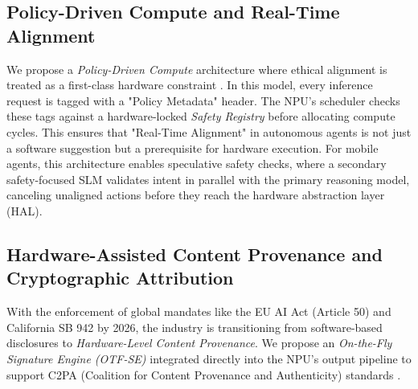 \documentclass[twocolumn,10pt]{article}
\begin{document}
\subsection{Policy-Driven Compute and Real-Time Alignment}
We propose a \textit{Policy-Driven Compute} architecture where ethical alignment is treated as a first-class hardware constraint \cite{policydriven2026}. In this model, every inference request is tagged with a "Policy Metadata" header. The NPU's scheduler checks these tags against a hardware-locked \textit{Safety Registry} before allocating compute cycles. This ensures that "Real-Time Alignment" in autonomous agents is not just a software suggestion but a prerequisite for hardware execution. For mobile agents, this architecture enables speculative safety checks, where a secondary safety-focused SLM validates intent in parallel with the primary reasoning model, canceling unaligned actions before they reach the hardware abstraction layer (HAL).

\subsection{Hardware-Assisted Content Provenance and Cryptographic Attribution}
With the enforcement of global mandates like the EU AI Act (Article 50) \cite{eu_ai_act_2024} and California SB 942 \cite{ca_sb942_2024} by 2026, the industry is transitioning from software-based disclosures to \textit{Hardware-Level Content Provenance}. We propose an \textit{On-the-Fly Signature Engine (OTF-SE)} integrated directly into the NPU's output pipeline to support C2PA (Coalition for Content Provenance and Authenticity) standards \cite{c2pa_spec_2024}.
\end{document}
